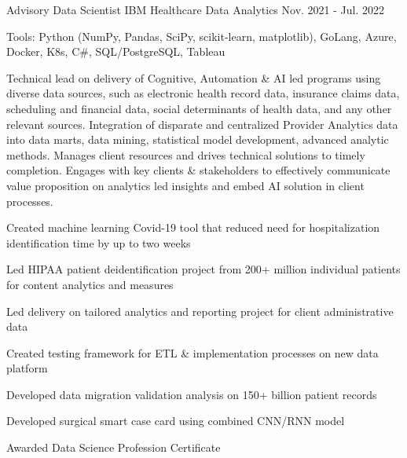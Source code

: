 \begin{cventries}
  \cvexpentry
    {Advisory Data Scientist} %
    {IBM}
    {Healthcare Data Analytics} %
    {Nov. 2021 - Jul. 2022}
    {
      \begin{cvheavyparagraph}
        Tools: Python (NumPy, Pandas, SciPy, scikit-learn, matplotlib), GoLang, Azure, Docker, K8s, C\#, SQL/PostgreSQL, Tableau
      \end{cvheavyparagraph}
    }
    {
      \begin{cvparagraph}
        Technical lead on delivery of Cognitive, Automation \& AI led programs using diverse data sources, such as electronic health record data, insurance claims data, scheduling and financial data, social determinants of health data, and any other relevant sources.  Integration of disparate and centralized Provider Analytics data into data marts, data mining, statistical model development, advanced analytic methods.  Manages client resources and drives technical solutions to timely completion.  Engages with key clients \& stakeholders to effectively communicate value proposition on analytics led insights and embed AI solution in client processes.
      \end{cvparagraph}
      \begin{cvitems}
        \item {Created machine learning Covid-19 tool that reduced need for hospitalization identification time by up to two weeks}
        \item {Led HIPAA patient deidentification project from 200+ million individual patients for content analytics and measures}
        \item {Led delivery on tailored analytics and reporting project for client administrative data}
        \item {Created testing framework for ETL \& implementation processes on new data platform}
        \item {Developed data migration validation analysis on 150+ billion patient records}
        \item {Developed surgical smart case card using combined CNN/RNN model}
        \item {Awarded Data Science Profession Certificate}
      \end{cvitems}
    }


\end{cventries}
